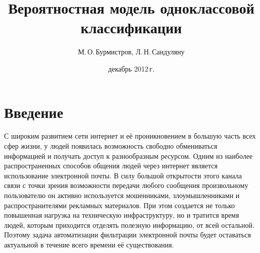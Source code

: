 \documentclass[12pt]{article}
\begin{document}
	\title{Вероятностная модель одноклассовой классификации}
	\author{М.\,О.\,Бурмистров, Л.\,Н.\,Сандуляну}
	\date{декабрь 2012\,г.}


\maketitle
\section{Введение} 							
	С широким развитием сети интернет и её проникновением в большую часть всех сфер жизни, у людей появилась возможность свободно обмениваться информацией и получать доступ к разнообразным ресурсом. 
	Одним из наиболее распространенных способов общения людей через интернет является использование электронной почты. 
	В силу большой открытости этого канала связи с точки зрения возможности передачи любого сообщения произвольному пользователю он активно используется мошенниками, злоумышленниками и распространителями рекламных материалов. При этом создается не только повышенная нагрузка на техническую инфраструктуру, но и тратится время людей, которым приходится отделять полезную информацию, от всей остальной. 
	Поэтому задача автоматизации фильтрации электронной почты будет оставаться актуальной в течение всего времени её существования.
\end{document}
